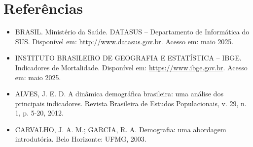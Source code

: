 \documentclass[12pt]{article}
\begin{document}
\section{Referências}
\begin{itemize}
    \item BRASIL. Ministério da Saúde. DATASUS – Departamento de Informática do SUS. Disponível em: \url{http://www.datasus.gov.br}. Acesso em: maio 2025.
    \item INSTITUTO BRASILEIRO DE GEOGRAFIA E ESTATÍSTICA – IBGE. Indicadores de Mortalidade. Disponível em: \url{https://www.ibge.gov.br}. Acesso em: maio 2025.
    \item ALVES, J. E. D. A dinâmica demográfica brasileira: uma análise dos principais indicadores. Revista Brasileira de Estudos Populacionais, v. 29, n. 1, p. 5-20, 2012.
    \item CARVALHO, J. A. M.; GARCIA, R. A. Demografia: uma abordagem introdutória. Belo Horizonte: UFMG, 2003.
\end{itemize}
\end{document}
